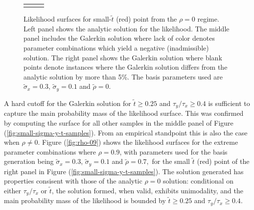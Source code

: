 \documentclass[10pt]{article}
\begin{document}
\begin{enumerate}
\begin{figure}
\begin{tabular}{ccc}
\begin{minipage}{0.33\textwidth}
    \end{minipage}
  \end{tabular}
  \caption{Likelihood surfaces for small-$\tilde{t}$ (red) point
    from the $\rho = 0$ regime. Left panel shows the analytic solution
    for the likelihood. The middle panel includes the Galerkin
    solution where lack of color denotes parameter combinations which
    yield a negative (inadmissible) solution. The right panel shows
    the Galerkin solution where blank points denote instances where
    the Galerkin solution differs from the analytic solution by more
    than 5\%. The basis parameters used are $\tilde{\sigma}_x = 0.3$,
    $\tilde{\sigma}_y = 0.1$ and $\tilde{\rho} = 0$.}
  \label{fig:small-t-sol}
\end{figure}


A hard cutoff for the Galerkin solution for $\tilde{t} \geq 0.25$ and
$\tau_y/\tau_x \geq 0.4$ is sufficient to capture the main probability
mass of the likelihood surface. This was confirmed by computing the
surface for all other samples in the middle panel of Figure
(\ref{fig:small-sigma-y-t-samples}). From an empirical standpoint this
is also the case when $\rho \neq 0$. Figure (\ref{fig:rho-09}) shows
the likelihood surfaces for the extreme parameter combinations where
$\rho = 0.9$, with parameters used for the basis generation being
$\tilde{\sigma}_x = 0.3$, $\tilde{\sigma}_y = 0.1$ and
$\tilde{\rho} = 0.7,$ for the small $\tilde{t}$ (red) point of the right panel in Figure
(\ref{fig:small-sigma-y-t-samples}). The solution generated has
properties consisent with those of the analytic $\rho=0$ solution:
conditional on either $\tau_y/\tau_x$ or $\tilde{t}$, the solution
formed, when valid, exhibits unimodality, and the main probability
mass of the likelihood is bounded by $\tilde{t} \geq 0.25$ and
$\tau_y/\tau_x \geq 0.4$.


\end{enumerate}
\end{document}
